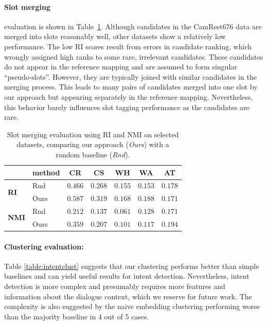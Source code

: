 \paragraph{Slot merging}\hspace{-3mm} evaluation is shown in Table~\ref{table:merging}.
Although candidates in the CamRest676 data are merged into slots reasonably well, other datasets show a relatively low performance.
The low RI scores result from errors in candidate ranking, which wrongly assigned high ranks to some rare, irrelevant candidates.
These candidates do not appear in the reference mapping and are assumed to form singular “pseudo-slots”.
However, they are typically joined with similar candidates in the merging process.
This leads to many pairs of candidates merged into one slot by our approach but appearing separately in the reference mapping.
Nevertheless, this behavior barely influences slot tagging performance as the candidates are rare.
\begin{table}[tp]
    \centering
    \small
    
    \begin{tabular}{ll|ccccc}
    \hline
      & \textbf{method}\hspace{-3mm} & \textbf{CR} & \textbf{CS} & \textbf{WH} & \textbf{WA} & \textbf{AT} \\
     \hline
     \multirow{2}{*}{\textbf{RI}} & Rnd & $0.466$ & $0.268$ & $0.155$ & $0.153$ & $0.178$ \\
     & Ours & $0.587$ & $0.319$ & $0.168$ & $0.188$ & $0.171$ \\\hline
     \multirow{2}{*}{\textbf{NMI}\hspace{-2mm}} & Rnd & $0.212$ & $0.137$ & $0.061$ & $0.128$ & $0.171$ \\
     & Ours & $0.359$ & $0.207$ & $0.101$ & $0.117$ & $0.194$ \\

     \hline
    \end{tabular}
    
    \caption{Slot merging evaluation using RI and NMI on selected datasets, comparing our approach (\emph{Ours}) with a random baseline (\emph{Rnd}).}
    \label{table:merging}
\end{table}

\paragraph{Clustering evaluation:} 
Table \ref{table:intentclust} suggests that our clustering performs better than simple baselines and can yield useful results for intent detection.
Nevertheless, intent detection is more complex and presumably requires more features and information about the dialogue context, which we reserve for future work.
The complexity is also suggested by the naive embedding clustering performing worse than the majority baseline in 4 out of 5 cases.

